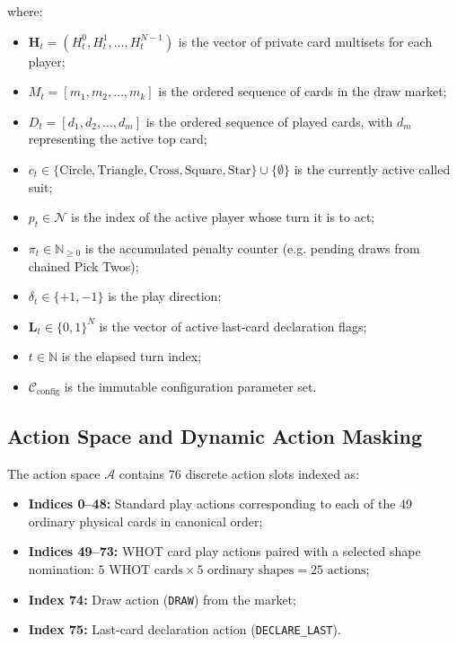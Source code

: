 \documentclass[11pt]{article}
\begin{document}
where:
\begin{itemize}
  \item $\mathbf{H}_t = (H_t^0, H_t^1, \dots, H_t^{N-1})$ is the vector of private card multisets for each player;
  \item $M_t = [m_1, m_2, \dots, m_k]$ is the ordered sequence of cards in the draw market;
  \item $D_t = [d_1, d_2, \dots, d_m]$ is the ordered sequence of played cards, with $d_m$ representing the active top card;
  \item $c_t \in \{\text{Circle}, \text{Triangle}, \text{Cross}, \text{Square}, \text{Star}\} \cup \{\emptyset\}$ is the currently active called suit;
  \item $p_t \in \mathcal{N}$ is the index of the active player whose turn it is to act;
  \item $\pi_t \in \mathbb{N}_{\ge 0}$ is the accumulated penalty counter (e.g. pending draws from chained Pick Twos);
  \item $\delta_t \in \{+1, -1\}$ is the play direction;
  \item $\mathbf{L}_t \in \{0, 1\}^N$ is the vector of active last-card declaration flags;
  \item $t \in \mathbb{N}$ is the elapsed turn index;
  \item $\mathcal{C}_{\text{config}}$ is the immutable configuration parameter set.
\end{itemize}

\subsection{Action Space and Dynamic Action Masking}
The action space $\mathcal{A}$ contains $76$ discrete action slots indexed as:
\begin{itemize}
  \item \textbf{Indices 0--48:} Standard play actions corresponding to each of the 49 ordinary physical cards in canonical order;
  \item \textbf{Indices 49--73:} WHOT card play actions paired with a selected shape nomination: $5 \text{ WHOT cards} \times 5 \text{ ordinary shapes} = 25 \text{ actions}$;
  \item \textbf{Index 74:} Draw action (\texttt{DRAW}) from the market;
  \item \textbf{Index 75:} Last-card declaration action (\texttt{DECLARE\_LAST}).
\end{itemize}
\end{document}
